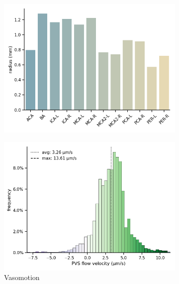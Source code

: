 \documentclass[fleqn,10pt]{wlscirep}
\begin{document}
\begin{figure}
\begin{subfigure}[b]{0.3\textwidth}
    \includegraphics[width =  \linewidth]{figures/vasomotion_arteries_labels_radius.png}
    \end{subfigure}
     \begin{subfigure}[b]{0.33\textwidth}
    \centering
    \includegraphics[width =  \linewidth]{figures/vasomotion_velocity_histo_cell.png}
    \caption{Vasomotion}
    \end{subfigure}
    \begin{subfigure}[b]{0.33\textwidth}
    \centering

\end{subfigure}
\end{figure}
\end{document}
